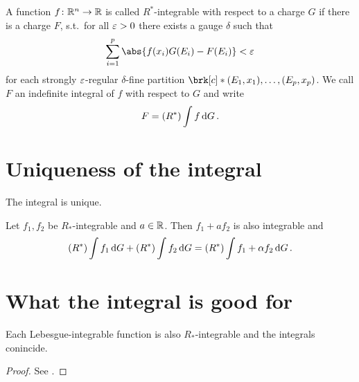 \begin{frame}
	\begin{definition}[$R^*$-integral]
	A function $f\colon \mathbb{R}^n\to\mathbb{R}$ is called $R^*$-integrable with respect to a charge $G$ if there is a charge $F$, s.t.\ for all $\varepsilon>0$ there exists a gauge $\delta$ such that
	\begin{align*}
		\sum_{i=1}^p\abs{f(x_i)G(E_i)-F(E_i)}<\e
	\end{align*}
	for each strongly $\varepsilon$-regular $\delta$-fine partition $\brk[c]*{(E_1,x_1),\dots,(E_p,x_p)}$. We call $F$ an indefinite integral of $f$ with respect to $G$ and write
	\begin{align*}
		F=(R^*)\int f\,\mathrm{d} G\,.
	\end{align*}
	\end{definition}
\end{frame}


\section{Uniqueness of the integral}
\begin{frame}
	\begin{proposition}
	The integral is unique.
	\end{proposition}
\end{frame}

\begin{frame}
	\begin{proposition}
	Let $f_1,f_2$ be $R_*$-integrable and $a\in\mathbb{R}$. Then $f_1+af_2$ is also integrable and
	\begin{align*}
		(R^*)\int f_1\,\mathrm{d} G + (R^*)\int f_2\,\mathrm{d} G=(R^*)\int f_1+\alpha f_2\,\mathrm{d} G\,.
	\end{align*}
	\end{proposition}
\end{frame}

\section{What the integral is good for}
\begin{frame}
	\begin{proposition}
	Each Lebesgue-integrable function is also $R_*$-integrable and the integrals conincide.
	\end{proposition}
	\begin{proof}
	See \cite[Proposition 3.5]{Pfe2016}.
	\end{proof}
\end{frame}

